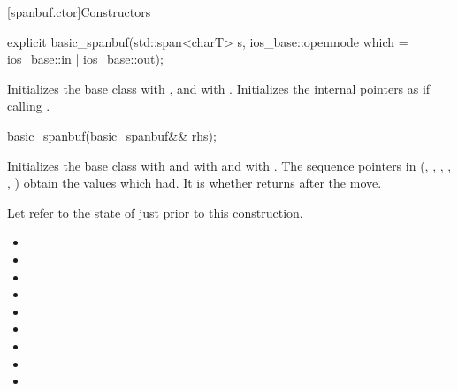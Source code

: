 [spanbuf.ctor]{Constructors}

%
\begin{itemdecl}
explicit basic_spanbuf(std::span<charT> s,
                       ios_base::openmode which = ios_base::in | ios_base::out);
\end{itemdecl}

\begin{itemdescr}
\pnum
\effects
Initializes the base class with ,
and  with .
Initializes the internal pointers as if calling .
\end{itemdescr}

%
\begin{itemdecl}
basic_spanbuf(basic_spanbuf&& rhs);
\end{itemdecl}

\begin{itemdescr}
\pnum
\effects
Initializes the base class with  and
 with  and
 with .
The sequence pointers in 
(, , ,
, , )
obtain the values which  had.
It is
whether  returns  after the move.

\pnum
\ensures
Let  refer to the state of 
just prior to this construction.
\begin{itemize}
\item {}
\item {}
\item {}
\item {}
\item {}
\item {}
\item {}
\item {}
\item {}
\end{itemize}
\end{itemdescr}

